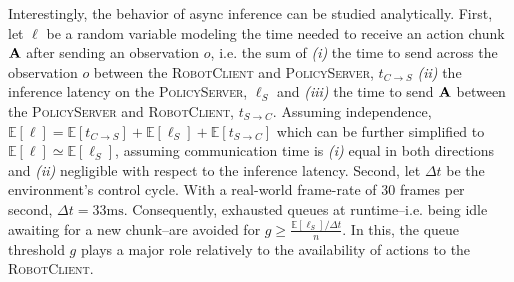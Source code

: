 Interestingly, the behavior of async inference can be studied analytically. First, let \( \ell \) be a random variable modeling the time needed to receive an action chunk \( \mathbf{A} \) after sending an observation \( o \), i.e. the sum of \emph{(i)} the time to send across the observation \( o \) between the \textsc{RobotClient} and \textsc{PolicyServer}, \( t_{C \to S}\) \emph{(ii)} the inference latency on the \textsc{PolicyServer}, \( \ell_S \) and \emph{(iii)} the time to send \( \mathbf{A} \) between the \textsc{PolicyServer} and \textsc{RobotClient}, \( t_{S \to C} \). Assuming independence, \( \mathbb E [\ell] = \mathbb E[t_{C \to S}] + \mathbb E[\ell_S] + \mathbb E[t_{S \to C}] \) which can be further simplified to \( \mathbb E[\ell] \simeq \mathbb E[\ell_S]  \), assuming communication time is \emph{(i)} equal in both directions and \emph{(ii)} negligible with respect to the inference latency. Second, let \(\Delta t\) be the environment’s control cycle. With a real-world frame-rate of 30 frames per second, \(\Delta t=33\text{ms}\). Consequently, exhausted queues at runtime--i.e. being idle awaiting for a new chunk--are avoided for \( g \geq \frac{\mathbb E[\ell_S] / \Delta t}{n} \). In this, the queue threshold \( g \) plays a major role relatively to the availability of actions to the \textsc{RobotClient}.

